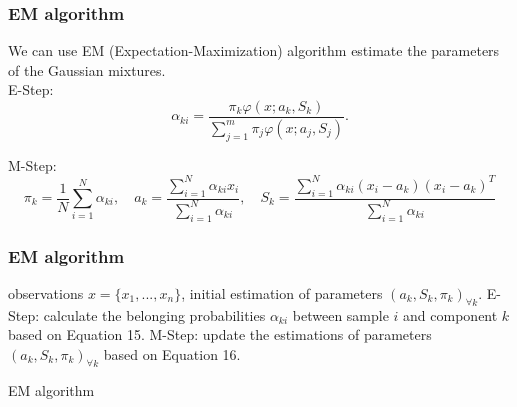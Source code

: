\documentclass{beamer}
\begin{document}
\begin{frame}
\frametitle{EM algorithm}
We can use EM (Expectation-Maximization) algorithm estimate the parameters of the Gaussian mixtures. \\%
E-Step:
\begin{equation}
\alpha _{ki} =  \frac{\pi_k\varphi(x;a_k,S_k)}{\sum\limits_{j=1}^{m}\pi_j\varphi(x;a_j,S_j)} .
\end{equation}


M-Step:
\begin{equation}
\pi _k= \frac{1}{N} \sum _{i=1}^{N} \alpha _{ki},  \quad a_k= \frac{\sum\limits_{i=1}^{N}\alpha_{ki}x_i}{\sum\limits_{i=1}^{N}\alpha_{ki}} ,  \quad S_k= \frac{\sum\limits_{i=1}^{N}\alpha_{ki}(x_i-a_k)(x_i-a_k)^T}{\sum\limits_{i=1}^{N}\alpha_{ki}}
\end{equation}
\end{frame}

\begin{frame}
\frametitle{EM algorithm}
\begin{algorithm}[H]
\begin{algorithmic}[1]
  \REQUIRE observations $x=\{x_1,...,x_n\}$, initial estimation of parameters $(a_k,S_k,\pi_k)_{\forall k}$.
  \LOOP 
  \STATE E-Step: calculate the belonging probabilities $\alpha_{ki}$ between sample $i$ and component $k$ based on Equation 15.
  \STATE M-Step: update the estimations of parameters $(a_k,S_k,\pi_k)_{\forall k}$ based on Equation 16.  
  \ENDLOOP
\end{algorithmic}
\caption{EM algorithm}
\end{algorithm}
\end{frame}

\end{document}
